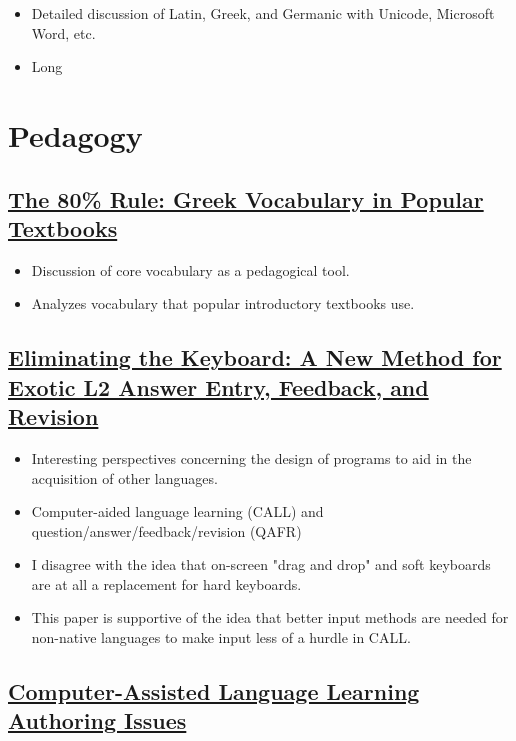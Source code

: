 \documentclass[11pt]{article}
\begin{document}
\begin{itemize}
\item Detailed discussion of Latin, Greek, and Germanic with Unicode, Microsoft Word, etc.
\item Long
\end{itemize}

\section{Pedagogy}
\label{sec:orgbe3bed0}

\subsection{\href{http://tcl.camws.org/sites/default/files/TCL\_I\_i\_67-108\_Clark\_0.pdf}{The 80\% Rule: Greek Vocabulary in Popular Textbooks}}
\label{sec:org318c3ff}

\begin{itemize}
\item Discussion of core vocabulary as a pedagogical tool.
\item Analyzes vocabulary that popular introductory textbooks use.
\end{itemize}

\subsection{\href{https://www.jstor.org/stable/24147886}{Eliminating the Keyboard: A New Method for Exotic L2 Answer Entry, Feedback, and Revision}}
\label{sec:org020d3ab}

\begin{itemize}
\item Interesting perspectives concerning the design of programs to aid in the acquisition of other languages.
\item Computer-aided language learning (CALL) and question/answer/feedback/revision (QAFR)
\item I disagree with the idea that on-screen "drag and drop" and soft keyboards are at all a replacement for hard keyboards.
\item This paper is supportive of the idea that better input methods are needed for non-native languages to make input less of a hurdle in CALL.
\end{itemize}

\subsection{\href{https://www.jstor.org/stable/25612275}{Computer-Assisted Language Learning Authoring Issues}}
\label{sec:orgeabe25f}
\end{document}
